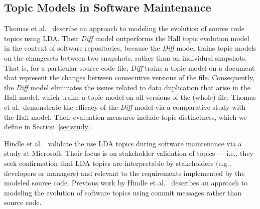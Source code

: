 \subsection{Topic Models in Software Maintenance}


Thomas et al.~\cite{Thomas-etal:2011} describe an approach to modeling the evolution of source code topics using LDA. Their \textit{Diff} model outperforms the Hall topic evolution model~\cite{Hall_etal:2008} in the context of software repositories, because the \textit{Diff} model trains topic models on the changesets between two snapshots, rather than on individual snapshots. That is, for a particular source code file, \textit{Diff} trains a topic model on a document that represent the changes between consecutive versions of the file. Consequently, the \textit{Diff} model eliminates the issues related to data duplication that arise in the Hall model, which trains a topic model on all versions of the (whole) file. Thomas et al.\ demonstrate the efficacy of the \textit{Diff} model via a comparative study with the Hall model. Their evaluation measures include topic distinctness, which we define in Section~\ref{sec:study}.

Hindle et al.~\cite{Hindle_etal:2012} validate the use LDA topics during software maintenance via a study at Microsoft. Their focus is on stakeholder validation of topics --- i.e., they seek confirmation that LDA topics are interpretable by stakeholders (e.g., developers or managers) and relevant to the requirements implemented by the modeled source code. Previous work by Hindle et al.~\cite{Hindle-etal:2009} describes an approach to modeling the evolution of software topics using commit messages rather than source code.

